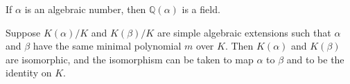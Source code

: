 \begin{corollary}
	If \(\alpha\) is an algebraic number, then \(\mathbb{Q}(\alpha)\) is a field.
\end{corollary}

\begin{corollary} \label{thm:minimal-polynomial-roots-isomorphic}
    Suppose $K(\alpha) / K$ and $K(\beta) / K$ are simple algebraic extensions such that $\alpha$ and $\beta$ have the same minimal polynomial $m$ over $K$. Then $K(\alpha)$ and $K(\beta)$ are isomorphic, and the isomorphism can be taken to map $\alpha$ to $\beta$ and to be the identity on $K$.
\end{corollary}




